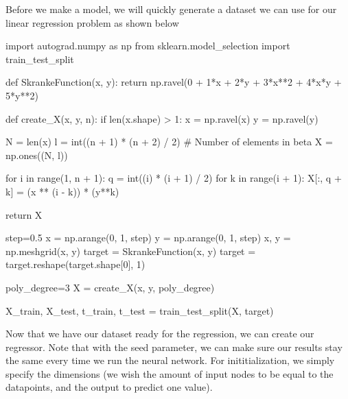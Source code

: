 \documentclass[%
oneside,                 %
final,                   %
10pt]{article}
\begin{document}
\epycod


Before we make a model, we will quickly generate a dataset we can use
for our linear regression problem as shown below




































\bpycod
import autograd.numpy as np
from sklearn.model_selection import train_test_split

def SkrankeFunction(x, y):
    return np.ravel(0 + 1*x + 2*y + 3*x**2 + 4*x*y + 5*y**2)

def create_X(x, y, n):
    if len(x.shape) > 1:
        x = np.ravel(x)
        y = np.ravel(y)

    N = len(x)
    l = int((n + 1) * (n + 2) / 2)  # Number of elements in beta
    X = np.ones((N, l))

    for i in range(1, n + 1):
        q = int((i) * (i + 1) / 2)
        for k in range(i + 1):
            X[:, q + k] = (x ** (i - k)) * (y**k)

    return X

step=0.5
x = np.arange(0, 1, step)
y = np.arange(0, 1, step)
x, y = np.meshgrid(x, y)
target = SkrankeFunction(x, y)
target = target.reshape(target.shape[0], 1)

poly_degree=3
X = create_X(x, y, poly_degree)

X_train, X_test, t_train, t_test = train_test_split(X, target)


\epycod


Now that we have our dataset ready for the regression, we can create
our regressor. Note that with the seed parameter, we can make sure our
results stay the same every time we run the neural network. For
inititialization, we simply specify the dimensions (we wish the amount
of input nodes to be equal to the datapoints, and the output to
predict one value).
\end{document}
